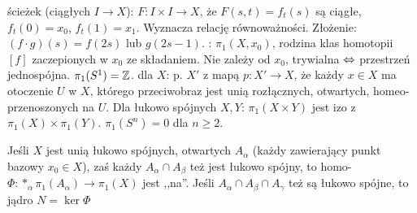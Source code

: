  ścieżek (ciągłych $I \to X$): $F \colon I \times I \to X$, że $F(s,t) = f_t(s)$ są ciągłe, $f_t(0) = x_0$, $f_t(1) = x_1$.
Wyznacza relację równoważności.
Złożenie: $(f \cdot g)(s) = f(2s)$ lub $g(2s - 1)$.
: $\pi_1(X, x_0)$, rodzina klas homotopii $[f]$  zaczepionych w $x_0$ ze składaniem.
Nie zależy od $x_0$, trywialna $\Leftrightarrow$ przestrzeń jednospójna.
$\pi_1(S^1) = \mathbb{Z}$.
 dla $X$: p. $X'$ z mapą $p \colon X' \to X$, że każdy $x \in X$ ma otoczenie $U$ w $X$, którego przeciwobraz jest unią rozłącznych, otwartych, homeo- przenoszonych na $U$.
Dla łukowo spójnych $X, Y$: $\pi_1(X\times Y)$ jest izo z $\pi_1(X) \times \pi_1(Y)$.
$\pi_1(S^n) = 0$ dla $n \ge 2$.


Jeśli $X$ jest unią łukowo spójnych, otwartych $A_\alpha$ (każdy zawierający punkt bazowy $x_0 \in X$), zaś każdy $A_\alpha \cap A_\beta$ też jest łukowo spójny, to homo- $\Phi: *_\alpha \pi_1(A_\alpha) \to \pi_1(X)$ jest ,,na''.
Jeśli $A_\alpha \cap A_\beta \cap A_\gamma$ też są łukowo spójne, to jądro $N = \ker \Phi$